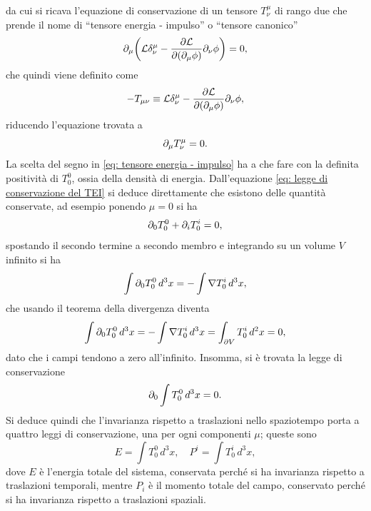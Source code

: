da cui si ricava l'equazione di conservazione di un tensore $T^\mu_\nu$ di rango due che prende il nome di ``tensore energia - impulso'' o ``tensore canonico''
\begin{equation}
\label{eq: legge di conservazione TEI in L}
    \partial_\mu\bigg(\mathcal{L}\delta^\mu_\nu - \frac{\partial\mathcal{L}}{\partial(\partial_\mu\phi)}\partial_\nu\phi\bigg) = 0,
\end{equation}
che quindi viene definito come
\begin{equation}
\label{eq: tensore energia - impulso}
    - T_{\mu\nu} \equiv \mathcal{L}\delta^\mu_\nu - \frac{\partial\mathcal{L}}{\partial(\partial_\mu\phi)}\partial_\nu\phi,
\end{equation}
riducendo l'equazione trovata a
\begin{equation}
\label{eq: legge di conservazione del TEI}
    \partial_\mu T^\mu_\nu = 0.
\end{equation}
La scelta del segno in \eqref{eq: tensore energia - impulso} ha a che fare con la definita positività di $T_0^0$, ossia della densità di energia. Dall'equazione \eqref{eq: legge di conservazione del TEI} si deduce direttamente che esistono delle quantità conservate, ad esempio ponendo $\mu = 0$ si ha
\begin{equation}
    \partial_0T^0_0 + \partial_i T^i_0 = 0,
\end{equation}
spostando il secondo termine a secondo membro e integrando su un volume $V$ infinito si ha
\begin{equation}
    \int \partial_0T^0_0\,d^3x = -\int \nabla T^i_0\,d^3x,
\end{equation}
che usando il teorema della divergenza diventa
\begin{equation}
    \int \partial_0T^0_0\,d^3x = -\int \nabla T^i_0\,d^3x = \int_{\partial V} T^i_0\,d^2x = 0,
\end{equation}
dato che i campi tendono a zero all'infinito. Insomma, si è trovata la legge di conservazione
\begin{equation}
    \partial_0\int T^0_0\,d^3x = 0.
\end{equation}
Si deduce quindi che l'invarianza rispetto a traslazioni nello spaziotempo porta a quattro leggi di conservazione, una per ogni componenti $\mu$; queste sono
\begin{equation}
    E = \int T_0^0\,d^3x,\quad P^i = \int T_0^i\,d^3x,
\end{equation}
dove $E$ è l'energia totale del sistema, conservata perché si ha invarianza rispetto a traslazioni temporali, mentre $P_i$ è il momento totale del campo, conservato perché si ha invarianza rispetto a traslazioni spaziali.


